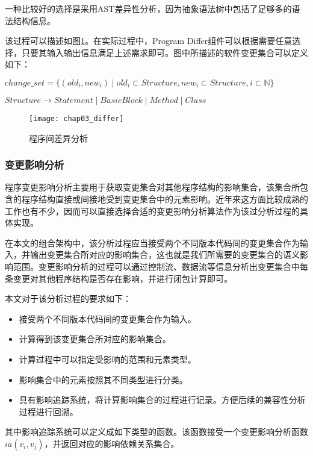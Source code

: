一种比较好的选择是采用AST差异性分析，因为抽象语法树中包括了足够多的语法结构信息。

该过程可以描述如图\ref {differ}。在实际过程中，Program Differ组件可以根据需要任意选择，只要其输入输出信息满足上述需求即可。图中所描述的软件变更集合可以定义如下：
\begin{definition}
	$ change\_set = \{ (old_i,new_i) \mid  old_i \subset Structure,new_i \subset Structure, i \subset \mathbb{N} \}$
\end{definition}

\begin{definition}
	$Structure \rightarrow Statement \mid Basic Block \mid Method \mid Class$
\end{definition}
\begin{figure}[H]
	\centering
	\texttt{[image: chap03\_differ]}
	\caption {程序间差异分析}
	\label {differ}	
\end{figure}

\subsubsection{变更影响分析}

程序变更影响分析主要用于获取变更集合对其他程序结构的影响集合，该集合所包含的程序结构直接或间接地受到变更集合中的元素影响。近年来这方面比较成熟的工作也有不少，因而可以直接选择合适的变更影响分析算法作为该过分析过程的具体实现。

在本文的组合架构中，该分析过程应当接受两个不同版本代码间的变更集合作为输入，并输出变更集合所对应的影响集合，这也就是我们所需要的变更集合的语义影响范围。变更影响分析的过程可以通过控制流、数据流等信息分析出变更集合中每条变更对其他程序结构是否存在影响，并进行闭包计算即可。

本文对于该分析过程的要求如下：
\begin{itemize}
	\item 接受两个不同版本代码间的变更集合作为输入。
	\item 计算得到该变更集合所对应的影响集合。
	\item 计算过程中可以指定受影响的范围和元素类型。
	\item 影响集合中的元素按照其不同类型进行分类。
	\item 具有影响追踪系统，将计算影响集合的过程进行记录。方便后续的兼容性分析过程进行回溯。
\end{itemize}

其中影响追踪系统可以定义成如下类型的函数。该函数接受一个变更影响分析函数$ia(v_i,v_j)$，并返回对应的影响依赖关系集合。

